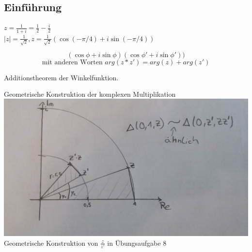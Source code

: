 \subsection{Einführung}

\begin{beispiel}
$z = \frac{1}{1+i} = \frac{1}{2} - \frac{i}{2}$\\
$|z| = \frac{1}{\sqrt{2}}, z = \frac{1}{\sqrt{2}}(\cos(-\pi/4)+i\sin(-\pi/4))$
\end{beispiel}

\begin{lemma}
\[
(\cos\phi + i\sin\phi)(\cos\phi\prime + i\sin\phi\prime))
\]
\[ \text{mit anderen Worten } arg(z*z\prime) = arg(z)+ arg(z\prime)
\]
\end{lemma}

\begin{bew}
Additionstheorem der Winkelfunktion.
\end{bew}
\begin{bemerkung}
	Geometrische Konstruktion der komplexen Multiplikation \\
	\includegraphics[scale=0.125]{pics/PolarMul.jpg} 
	Geometrische Konstruktion von $\frac{z}{z'}$ in Übungsaufgabe 8
\end{bemerkung}

